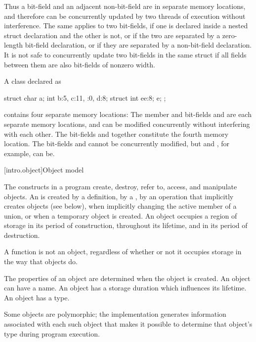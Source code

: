 \pnum
\begin{note}
Thus a bit-field and an adjacent non-bit-field are in separate memory
locations, and therefore can be concurrently updated by two threads of execution
without interference. The same applies to two bit-fields, if one is declared
inside a nested struct declaration and the other is not, or if the two are
separated by a zero-length bit-field declaration, or if they are separated by a
non-bit-field declaration. It is not safe to concurrently update two bit-fields
in the same struct if all fields between them are also bit-fields of nonzero
width.
\end{note}

\pnum
\begin{example}
A class declared as
\begin{codeblock}
struct {
  char a;
  int b:5,
  c:11,
  :0,
  d:8;
  struct {int ee:8;} e;
};
\end{codeblock}
contains four separate memory locations: The member  and bit-fields
 and  are each separate memory locations, and can be
modified concurrently without interfering with each other. The bit-fields
 and  together constitute the fourth memory location. The
bit-fields  and  cannot be concurrently modified, but
 and , for example, can be.
\end{example}

[intro.object]{Object model}

\pnum
{}%
The constructs in a \Cpp{} program create, destroy, refer to, access, and
manipulate objects.
An  is created
by a definition,
by a ,
by an operation that implicitly creates objects (see below),
when implicitly changing the active member of a union,
or
when a temporary object is created.
An object occupies a region of storage
in its period of construction,
throughout its lifetime,
and
in its period of destruction.
\begin{note}
A function is not an object, regardless of whether or not it
occupies storage in the way that objects do.
\end{note}
The properties of an
object are determined when the object is created. An object can have a
name. An object has a storage
duration which influences its
lifetime. An object has a
type.
\begin{note}
Some objects are
polymorphic; the implementation
generates information associated with each such object that makes it
possible to determine that object's type during program execution.
\end{note}

